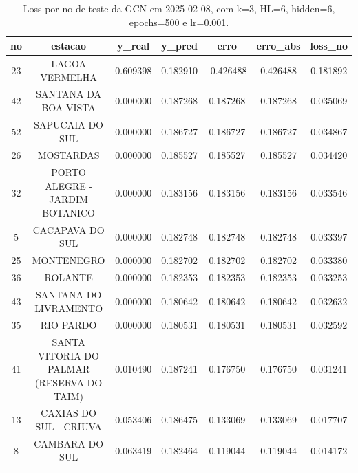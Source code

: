 \begin{table}[h]
\centering
\caption{Loss por no de teste da GCN em 2025-02-08, com k=3, HL=6, hidden=6, epochs=500 e lr=0.001.}
\label{tab:gcn_loss_k3_hl6_h6_e500_d20250208}
\begin{tabular}{ccccccc}
\toprule
no & estacao & y\_real & y\_pred & erro & erro\_abs & loss\_no \\
\midrule
23 & LAGOA VERMELHA & 0.609398 & 0.182910 & -0.426488 & 0.426488 & 0.181892 \\
42 & SANTANA DA BOA VISTA & 0.000000 & 0.187268 & 0.187268 & 0.187268 & 0.035069 \\
52 & SAPUCAIA DO SUL & 0.000000 & 0.186727 & 0.186727 & 0.186727 & 0.034867 \\
26 & MOSTARDAS & 0.000000 & 0.185527 & 0.185527 & 0.185527 & 0.034420 \\
32 & PORTO ALEGRE - JARDIM BOTANICO & 0.000000 & 0.183156 & 0.183156 & 0.183156 & 0.033546 \\
5 & CACAPAVA DO SUL & 0.000000 & 0.182748 & 0.182748 & 0.182748 & 0.033397 \\
25 & MONTENEGRO & 0.000000 & 0.182702 & 0.182702 & 0.182702 & 0.033380 \\
36 & ROLANTE & 0.000000 & 0.182353 & 0.182353 & 0.182353 & 0.033253 \\
43 & SANTANA DO LIVRAMENTO & 0.000000 & 0.180642 & 0.180642 & 0.180642 & 0.032632 \\
35 & RIO PARDO & 0.000000 & 0.180531 & 0.180531 & 0.180531 & 0.032592 \\
41 & SANTA VITORIA DO PALMAR (RESERVA DO TAIM) & 0.010490 & 0.187241 & 0.176750 & 0.176750 & 0.031241 \\
13 & CAXIAS DO SUL - CRIUVA & 0.053406 & 0.186475 & 0.133069 & 0.133069 & 0.017707 \\
8 & CAMBARA DO SUL & 0.063419 & 0.182464 & 0.119044 & 0.119044 & 0.014172 \\
\bottomrule
\end{tabular}
\end{table}
